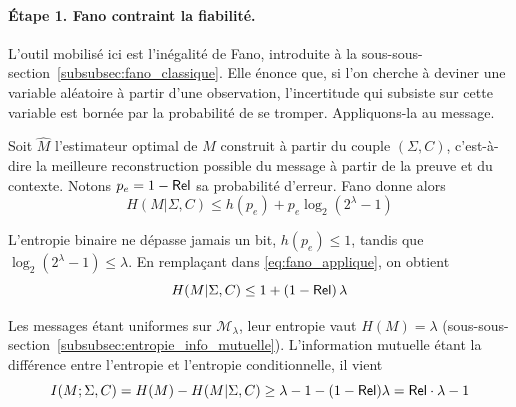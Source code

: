 \begin{sloppypar}
\begin{Preuve}
    \paragraph{\'Etape 1. Fano contraint la fiabilit\'e.}
    L'outil mobilis\'e ici est l'in\'egalit\'e de Fano, introduite \`a la
    sous-sous-section~\ref{subsubsec:fano_classique}. Elle \'enonce que, si l'on
    cherche \`a deviner une variable al\'eatoire \`a partir d'une observation,
    l'incertitude qui subsiste sur cette variable est born\'ee par la
    probabilit\'e de se tromper. Appliquons-la au message.

    Soit $\hat{M}$ l'estimateur optimal de $M$ construit \`a partir du couple
    $(\Sigma, C)$, c'est-\`a-dire la meilleure reconstruction possible du
    message \`a partir de la preuve et du contexte. Notons
    $p_e = 1 - \mathsf{Rel}$ sa probabilit\'e d'erreur. Fano donne alors
    \begin{equation}
    H(M|\Sigma,C) \leq h(p_e) + p_e\log_2(2^\lambda - 1)
    \label{eq:fano_applique}
    \end{equation}

    L'entropie binaire ne d\'epasse jamais un bit, $h(p_e) \leq 1$, tandis que
    $\log_2(2^\lambda - 1) \leq \lambda$. En rempla\c{c}ant dans
    \eqref{eq:fano_applique}, on obtient
    \begin{equation}
    H(M|\Sigma,C) \leq 1 + (1 - \mathsf{Rel})\,\lambda
    \end{equation}

    Les messages \'etant uniformes sur $\mathcal{M}_\lambda$, leur entropie
    vaut $H(M) = \lambda$ (sous-sous-section~\ref{subsubsec:entropie_info_mutuelle}).
    L'information mutuelle \'etant la diff\'erence entre l'entropie et
    l'entropie conditionnelle, il vient
    \begin{equation}
    I(M;\Sigma,C) = H(M) - H(M|\Sigma,C) \geq \lambda - 1 - (1-\mathsf{Rel})\lambda = \mathsf{Rel} \cdot \lambda - 1
    \label{eq:fano_mi}
    \end{equation}


\end{Preuve}
\end{sloppypar}
